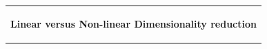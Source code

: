 %
\begin{titlepage}
\vspace*{\fill}
  \addtolength{\hoffset}{0.5\evensidemargin-0.5\oddsidemargin} %
  \noindent%
  {\color{white}\colorbox{aaublue}{\begin{tabular}{@{}p{\textwidth}@{}}
    \begin{center}
    \Huge{\textbf{
      Linear versus Non-linear Dimensionality reduction%
    }}
    \end{center}
    \begin{center}
      \Large{
}
\end{center}
\end{tabular}}}
\end{titlepage}
